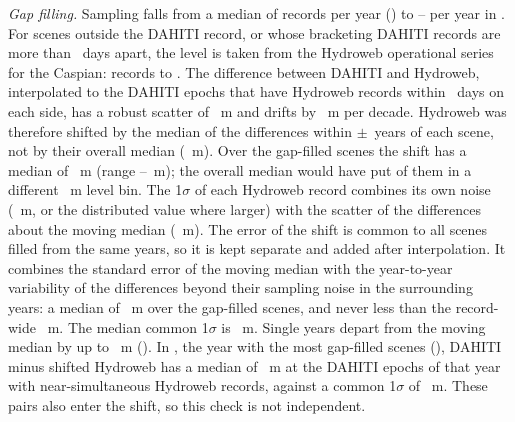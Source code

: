 \emph{Gap filling.} Sampling falls from a median of  records per year () to -- per year in . For scenes outside the DAHITI record, or whose bracketing DAHITI records are more than ~days apart, the level is taken from the Hydroweb operational series for the Caspian\citep{cretaux2011,hydrowebwl}:  records to . The difference between DAHITI and Hydroweb, interpolated to the  DAHITI epochs that have Hydroweb records within ~days on each side, has a robust scatter of ~m and drifts by ~m per decade. Hydroweb was therefore shifted by the median of the differences within $\pm$~years of each scene, not by their overall median (~m). Over the gap-filled scenes the shift has a median of ~m (range --~m); the overall median would have put  of them in a different ~m level bin. The 1$\sigma$ of each Hydroweb record combines its own noise (~m, or the distributed value where larger) with the scatter of the differences about the moving median (~m). The error of the shift is common to all scenes filled from the same years, so it is kept separate and added after interpolation. It combines the standard error of the moving median with the year-to-year variability of the differences beyond their sampling noise in the surrounding years: a median of ~m over the gap-filled scenes, and never less than the record-wide ~m. The median common 1$\sigma$ is ~m. Single years depart from the moving median by up to ~m (). In , the year with the most gap-filled scenes (), DAHITI minus shifted Hydroweb has a median of ~m at the  DAHITI epochs of that year with near-simultaneous Hydroweb records, against a common 1$\sigma$ of ~m. These pairs also enter the shift, so this check is not independent.

